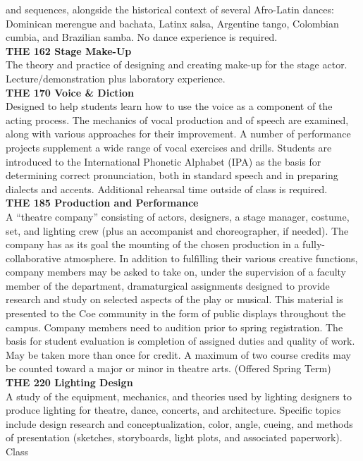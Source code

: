 \documentclass[
  letterpaper,
]{scrbook}
\begin{document}
and sequences, alongside the historical context of several Afro-Latin
dances: Dominican merengue and bachata, Latinx salsa, Argentine tango,
Colombian cumbia, and Brazilian samba. No dance experience is
required.\\
\textbf{THE 162 Stage Make-Up}\\
The theory and practice of designing and creating make-up for the stage
actor. Lecture/demonstration plus laboratory experience.\\
\textbf{THE 170 Voice \& Diction}\\
Designed to help students learn how to use the voice as a component of
the acting process. The mechanics of vocal production and of speech are
examined, along with various approaches for their improvement. A number
of performance projects supplement a wide range of vocal exercises and
drills. Students are introduced to the International Phonetic Alphabet
(IPA) as the basis for determining correct pronunciation, both in
standard speech and in preparing dialects and accents. Additional
rehearsal time outside of class is required.\\
\textbf{THE 185 Production and Performance}\\
A ``theatre company'' consisting of actors, designers, a stage manager,
costume, set, and lighting crew (plus an accompanist and choreographer,
if needed). The company has as its goal the mounting of the chosen
production in a fully-collaborative atmosphere. In addition to
fulfilling their various creative functions, company members may be
asked to take on, under the supervision of a faculty member of the
department, dramaturgical assignments designed to provide research and
study on selected aspects of the play or musical. This material is
presented to the Coe community in the form of public displays throughout
the campus. Company members need to audition prior to spring
registration. The basis for student evaluation is completion of assigned
duties and quality of work. May be taken more than once for credit. A
maximum of two course credits may be counted toward a major or minor in
theatre arts. (Offered Spring Term)\\
\textbf{THE 220 Lighting Design}\\
A study of the equipment, mechanics, and theories used by lighting
designers to produce lighting for theatre, dance, concerts, and
architecture. Specific topics include design research and
conceptualization, color, angle, cueing, and methods of presentation
(sketches, storyboards, light plots, and associated paperwork). Class
\end{document}
